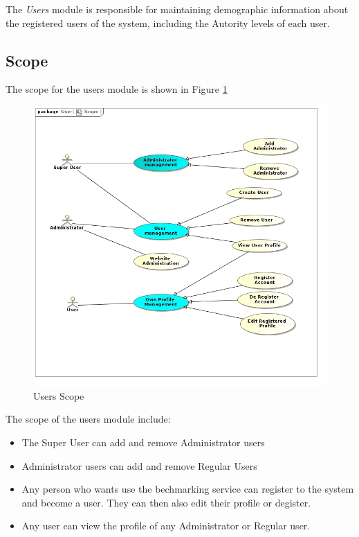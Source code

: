 The \textit{Users} module is responsible for maintaining demographic information
about the registered users of the system, including the Autority levels of each
user.

\subsection{Scope}
The scope for the users module is shown in Figure \ref{Users Scope}
\begin{figure}[H]
  \begin{center}
  \includegraphics[scale=0.5]{../Diagrams and Charts/Users/Scope.jpg}
  \caption{Users Scope}
  \end{center}
  \label{Users Scope}
\end{figure}
The scope of the users module include:
\begin{itemize}
	\item The Super User can add and remove Administrator users
	\item Administrator users can add and remove Regular Users
	\item Any person who wants use the bechmarking service can register
	to the system and become a user. They can then also edit
	their profile or degister.
	\item Any user can view the profile of any Administrator or Regular
	user.
\end{itemize}

